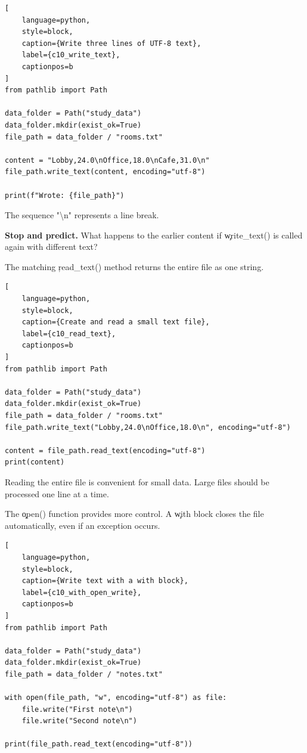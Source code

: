 \begin{lstlisting}[
    language=python,
    style=block,
    caption={Write three lines of UTF-8 text},
    label={c10_write_text},
    captionpos=b
]
from pathlib import Path

data_folder = Path("study_data")
data_folder.mkdir(exist_ok=True)
file_path = data_folder / "rooms.txt"

content = "Lobby,24.0\nOffice,18.0\nCafe,31.0\n"
file_path.write_text(content, encoding="utf-8")

print(f"Wrote: {file_path}")
\end{lstlisting}

The sequence "\textbackslash n" represents a line break.

\begin{NoteBox}
\textbf{Stop and predict.} What happens to the earlier content if
\c{write_text()} is called again with different text?
\end{NoteBox}


The matching \c{read_text()} method returns the entire file as one string.

\begin{lstlisting}[
    language=python,
    style=block,
    caption={Create and read a small text file},
    label={c10_read_text},
    captionpos=b
]
from pathlib import Path

data_folder = Path("study_data")
data_folder.mkdir(exist_ok=True)
file_path = data_folder / "rooms.txt"
file_path.write_text("Lobby,24.0\nOffice,18.0\n", encoding="utf-8")

content = file_path.read_text(encoding="utf-8")
print(content)
\end{lstlisting}

Reading the entire file is convenient for small data. Large files should be
processed one line at a time.


The \c{open()} function provides more control. A \c{with} block closes the file
automatically, even if an exception occurs.

\begin{lstlisting}[
    language=python,
    style=block,
    caption={Write text with a with block},
    label={c10_with_open_write},
    captionpos=b
]
from pathlib import Path

data_folder = Path("study_data")
data_folder.mkdir(exist_ok=True)
file_path = data_folder / "notes.txt"

with open(file_path, "w", encoding="utf-8") as file:
    file.write("First note\n")
    file.write("Second note\n")

print(file_path.read_text(encoding="utf-8"))
\end{lstlisting}

